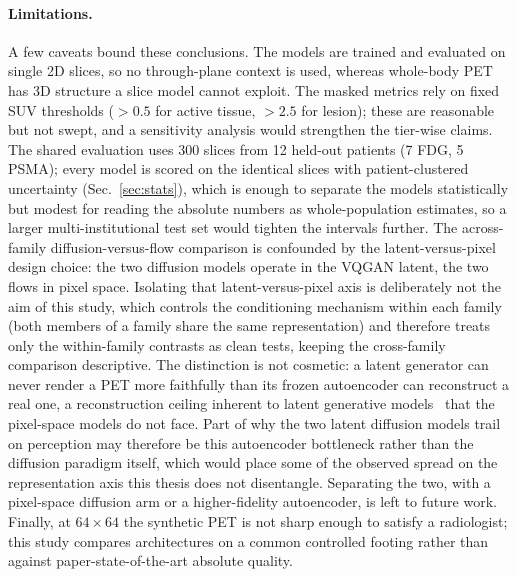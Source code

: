 \documentclass[11pt,a4paper]{article}
\newcommand{\num}[1]{#1}
\begin{document}
\paragraph{Limitations.}
\label{sec:limitations}
A few caveats bound these conclusions. The models are trained and evaluated on single 2D slices,
so no through-plane context is used, whereas whole-body PET has 3D structure a slice model cannot
exploit. The masked metrics rely on fixed SUV thresholds ($>0.5$ for active tissue, $>2.5$ for
lesion); these are reasonable but not swept, and a sensitivity analysis would strengthen the
tier-wise claims. The shared evaluation uses \num{300} slices from \num{12} held-out patients
(\num{7} FDG, \num{5} PSMA); every model is scored on the identical slices with patient-clustered
uncertainty (Sec.~\ref{sec:stats}), which is enough to separate the models statistically but
modest for reading the absolute numbers as whole-population estimates, so a larger
multi-institutional test set would tighten the intervals further. The across-family
diffusion-versus-flow comparison is confounded by the latent-versus-pixel design choice: the two
diffusion models operate in the VQGAN latent, the two flows in pixel space. Isolating that
latent-versus-pixel axis is deliberately not the aim of this study, which controls the conditioning
mechanism within each family (both members of a family share the same representation) and therefore
treats only the within-family contrasts as clean tests, keeping the cross-family comparison
descriptive. The distinction is not cosmetic: a latent generator can never render a PET more
faithfully than its frozen autoencoder can reconstruct a real one, a reconstruction ceiling inherent
to latent generative models~\parencite{rombach2022ldm,esser2021vqgan} that the pixel-space models do
not face. Part of why the two latent diffusion models trail on perception may
therefore be this autoencoder bottleneck rather than the diffusion paradigm itself, which would
place some of the observed spread on the representation axis this thesis does not disentangle.
Separating the two, with a pixel-space diffusion arm or a higher-fidelity autoencoder, is left to
future work. Finally, at $64\times64$ the
synthetic PET is not sharp enough to satisfy a radiologist; this study compares architectures on a
common controlled footing rather than against paper-state-of-the-art absolute quality.

\end{document}
